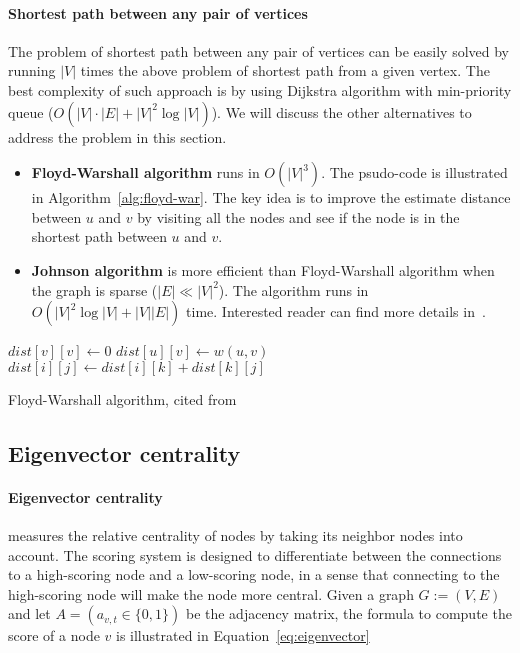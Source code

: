 \paragraph{Shortest path between any pair of vertices}
The problem of shortest path between any pair of vertices can be easily solved by running $|V|$ times the above problem of shortest path from a given vertex. The best complexity of such approach is by using Dijkstra algorithm with min-priority queue ($O(|V|\cdot|E|+|V|^2\log|V|)$). We will discuss the other alternatives to address the problem in this section.
	\begin{itemize}	
		\item {\bf Floyd-Warshall algorithm} runs in $O(|V|^3)$. The psudo-code is illustrated in Algorithm~\ref{alg:floyd-war}. The key idea is to improve the estimate distance between $u$ and $v$ by visiting all the nodes and see if the node is in the shortest path between $u$ and $v$.

	 	\item {\bf Johnson algorithm} is more efficient than Floyd-Warshall algorithm when the graph is sparse ($|E| \ll |V|^2$). The algorithm runs in $O(|V|^2\log|V| + |V||E|)$ time. Interested reader can find more details in~\cite{johnson-alg}.
	\end{itemize}

\begin{algorithm}
	\begin{algorithmic}[1]		
		   \State $dist[v][v] \gets 0$	
		\EndFor
		   \State $dist[u][v] \gets w(u,v)$  
		\EndFor
		            \State $dist[i][j]\gets  dist[i][k] + dist[k][j]$
		        \EndIf
		      \EndFor
		    \EndFor
		\EndFor
	\end{algorithmic}
\caption{Floyd-Warshall algorithm, cited from~\cite{floyd-war-wiki}}
\label{alg:floyd-war}
\end{algorithm}

\subsection{Eigenvector centrality}
\paragraph{Eigenvector centrality} measures the relative centrality of nodes by taking its neighbor nodes into account. The scoring system is designed to differentiate between the connections to a high-scoring node and a low-scoring node, in a sense that connecting to the high-scoring node will make the node more central. Given a graph $G:=(V,E)$ and let $A = (a_{v,t}\in\{0, 1\})$ be the adjacency matrix, the formula to compute the score of a node $v$ is illustrated in Equation~\eqref{eq:eigenvector}


